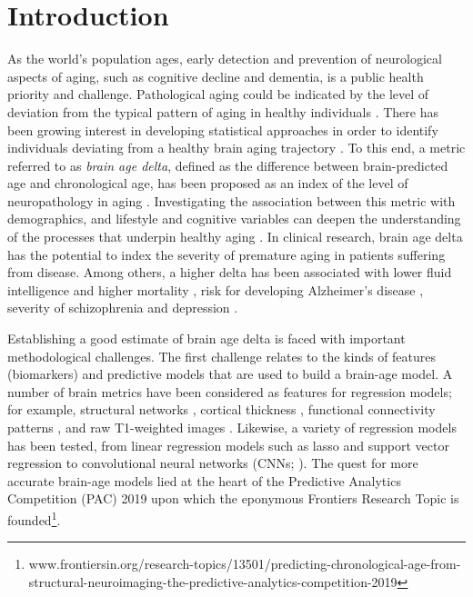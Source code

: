 \documentclass[utf8]{frontiersSCNS} %
\begin{document}
\section{Introduction}

As the world’s population ages, early detection and prevention of neurological aspects of aging, such as cognitive decline and dementia, is a public health priority and challenge. Pathological aging could be indicated by the level of deviation from the typical pattern of aging in healthy individuals \citep{Cole2018BrainMortality}. There has been growing interest in developing statistical approaches in order to identify individuals deviating from a healthy brain aging trajectory \citep{Cole2017PredictingBiomarker}. To this end, a metric referred to as \textit{brain age delta}, defined as the difference between brain-predicted age and chronological age, has been proposed as an index of the level of neuropathology in aging \citep{Cole2017PredictingBiomarker,Smith2019EstimationImaging,deLange2020Commentary:Prediction}. Investigating the association between this metric with demographics, and lifestyle and cognitive variables can deepen the understanding of the processes that underpin healthy aging  \citep{Borgeest2020GreaterAbilities}. In clinical research, brain age delta has the potential to index the severity of premature aging in patients suffering from disease. Among others, a higher delta has been associated with lower fluid intelligence and higher mortality \citep{Cole2018BrainMortality}, risk for developing Alzheimer’s disease \citep{Gaser2013BrainAGEDisease}, severity of schizophrenia and depression  \citep{Koutsouleris2014AcceleratedDisorders}.


Establishing a good estimate of brain age delta is faced with important methodological challenges. The first challenge relates to the kinds of features (biomarkers) and predictive models that are used to build a brain-age model. A number of brain metrics have been considered as features for regression models; for example, structural networks \citep{Jiang2020PredictingNetworks}, cortical thickness \citep{Aycheh2018BiologicalStudy}, functional connectivity patterns \citep{Zhai2019PredictingNetworks,Monti2020InterpretableConnectivity}, and raw T1-weighted images \citep{Cole2017PredictingBiomarker,Cole2018BrainMortality}. Likewise, a variety of regression models has been tested, from linear regression models such as lasso and support vector regression \citep{Zhai2019PredictingNetworks,Monti2020InterpretableConnectivity} to convolutional neural networks (CNNs; \citep{Cole2017PredictingBiomarker,Jiang2020PredictingNetworks}).
The quest for more accurate brain-age models lied at the heart of the Predictive Analytics Competition (PAC) 2019 upon which the eponymous Frontiers Research Topic is founded\footnote{www.frontiersin.org/research-topics/13501/predicting-chronological-age-from-structural-neuroimaging-the-predictive-analytics-competition-2019}.
\end{document}
